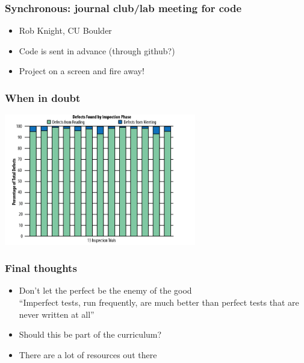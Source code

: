 \documentclass{beamer}
\begin{document}
\begin{frame}
\frametitle{Synchronous: journal club/lab meeting for code}
\begin{itemize}
\pause
\item
Rob Knight, CU Boulder \footnotemark[1]
\pause
\item
Code is sent in advance (through github?)
\pause
\item 
Project on a screen and fire away!
\end{itemize}
\end{frame}

\begin{frame}
\frametitle{When in doubt}
\includegraphics[height=5.7cm]{figures/review_meetings.png}
\end{frame}

\begin{frame}
\frametitle{Final thoughts}
\begin{itemize}
\pause
\item
Don't let the perfect be the enemy of the good
\\
``Imperfect tests, run frequently, are much better than perfect tests that are
never written at all''\footnotemark[1]
\pause
\item
Should this be part of the curriculum?
\pause
\item
There are a lot of resources out there
\end{itemize}
\end{frame}
\end{document}

